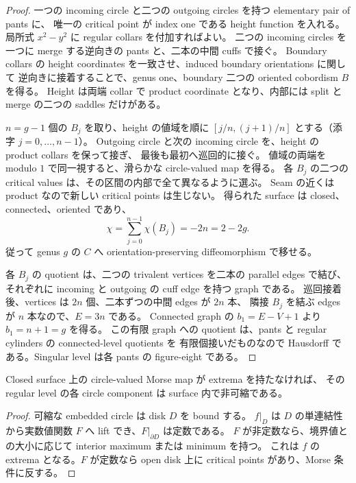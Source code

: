 \begin{proof}
一つの incoming circle と二つの outgoing circles を持つ elementary pair of pants に、
唯一の critical point が index one である height function を入れる。
局所式 $x^2-y^2$ に regular collars を付加すればよい。
二つの incoming circles を一つに merge する逆向きの pants と、二本の中間 cuffs で接ぐ。
Boundary collars の height coordinates を一致させ、induced boundary orientations に関して
逆向きに接着することで、genus one、boundary 二つの oriented cobordism $B$ を得る。
Height は両端 collar で product coordinate となり、内部には split と merge の二つの saddles だけがある。

$n=g-1$ 個の $B_j$ を取り、height の値域を順に
$[j/n,(j+1)/n]$ とする（添字 $j=0,\ldots,n-1$）。
Outgoing circle と次の incoming circle を、height の product collars を保って接ぎ、
最後も最初へ巡回的に接ぐ。
値域の両端を modulo $1$ で同一視すると、滑らかな circle-valued map を得る。
各 $B_j$ の二つの critical values は、その区間の内部で全て異なるように選ぶ。
Seam の近くは product なので新しい critical points は生じない。
得られた surface は closed、connected、oriented であり、
\[
 \chi=\sum_{j=0}^{n-1}\chi(B_j)=-2n=2-2g.
\]
従って genus $g$ の $C$ へ orientation-preserving diffeomorphism で移せる。

各 $B_j$ の quotient は、二つの trivalent vertices を二本の parallel edges で結び、
それぞれに incoming と outgoing の cuff edge を持つ graph である。
巡回接着後、vertices は $2n$ 個、二本ずつの中間 edges が $2n$ 本、
隣接 $B_j$ を結ぶ edges が $n$ 本なので、$E=3n$ である。
Connected graph の $b_1=E-V+1$ より $b_1=n+1=g$ を得る。
この有限 graph への quotient は、pants と regular cylinders の connected-level quotients を
有限個接いだものなので Hausdorff である。Singular level は各 pants の figure-eight である。
\end{proof}

\begin{lemma}\label{ncb:essential-circles}
Closed surface 上の circle-valued Morse map が extrema を持たなければ、
その regular level の各 circle component は surface 内で非可縮である。
\end{lemma}

\begin{proof}
可縮な embedded circle は disk $D$ を bound する。
$f|_D$ は $D$ の単連結性から実数値関数 $F$ へ lift でき、$F|_{\partial D}$ は定数である。
$F$ が非定数なら、境界値との大小に応じて interior maximum または minimum を持つ。
これは $f$ の extrema となる。$F$ が定数なら open disk 上に critical points があり、Morse 条件に反する。
\end{proof}

